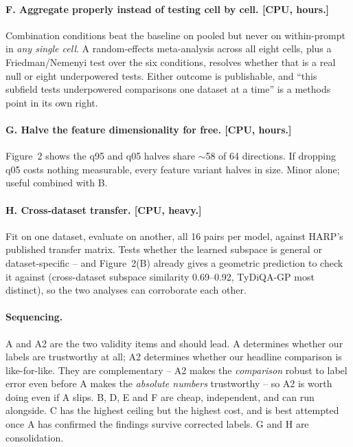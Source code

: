 \documentclass[11pt,a4paper]{article}
\begin{document}
\paragraph{F. Aggregate properly instead of testing cell by cell. [CPU, hours.]} Combination
conditions beat the baseline on pooled but never on within-prompt in \emph{any single cell}. A
random-effects meta-analysis across all eight cells, plus a Friedman/Nemenyi test over the six
conditions, resolves whether that is a real null or eight underpowered tests. Either outcome is
publishable, and ``this subfield tests underpowered comparisons one dataset at a time'' is a
methods point in its own right.

\paragraph{G. Halve the feature dimensionality for free. [CPU, hours.]} Figure~2 shows the q95 and
q05 halves share $\sim$58 of 64 directions. If dropping q05 costs nothing measurable, every feature
variant halves in size. Minor alone; useful combined with B.

\paragraph{H. Cross-dataset transfer. [CPU, heavy.]} Fit on one dataset, evaluate on another, all
16 pairs per model, against HARP's published transfer matrix. Tests whether the learned subspace is
general or dataset-specific -- and Figure~2(B) already gives a geometric prediction to check it
against (cross-dataset subspace similarity 0.69--0.92, TyDiQA-GP most distinct), so the two
analyses can corroborate each other.

\paragraph{Sequencing.} A and A2 are the two validity items and should lead. A determines whether
our labels are trustworthy at all; A2 determines whether our headline comparison is like-for-like.
They are complementary -- A2 makes the \emph{comparison} robust to label error even before A makes
the \emph{absolute numbers} trustworthy -- so A2 is worth doing even if A slips. B, D, E and F are
cheap, independent, and can run alongside. C has the highest ceiling but the highest cost, and is
best attempted once A has confirmed the findings survive corrected labels. G and H are
consolidation.
\end{document}
